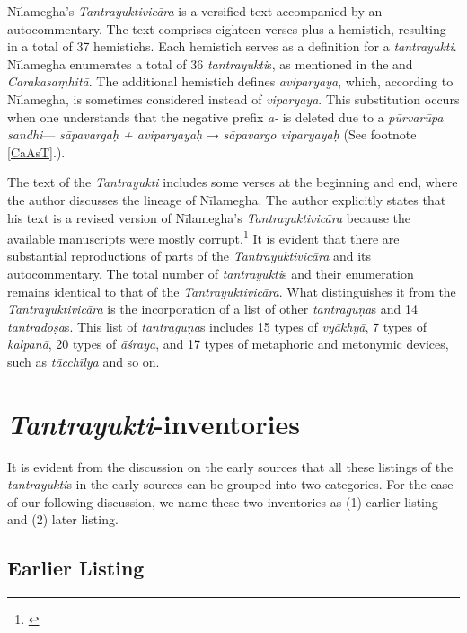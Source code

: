 Nīlamegha's \emph{Tantrayuktivicāra} is a versified text accompanied by an autocommentary. The text comprises eighteen verses plus a hemistich, resulting in a total of 37 hemistichs. Each hemistich serves as a definition for a \emph{tantrayukti}. Nīlamegha enumerates a total of 36 \emph{tantrayukti}s, as mentioned in the \AS and \emph{Carakasaṃhitā}. The additional hemistich defines \emph{aviparyaya}, which, according to Nīlamegha, is sometimes considered instead of \emph{viparyaya}. This substitution occurs when one understands that the negative prefix \emph{a-} is deleted due to a \emph{pūrvarūpa sandhi}--- \emph{sāpavargaḥ + aviparyayaḥ} → \emph{sāpavargo viparyayaḥ} (See footnote \ref{CaAsT}.).

The text of the \emph{Tantrayukti} includes some verses at the beginning and end, where the author discusses the lineage of Nīlamegha. The author explicitly states that his text is a revised version of Nīlamegha's \emph{Tantrayuktivicāra} because the available manuscripts were mostly corrupt.\footnote{
	\cite[1]{nara-1949}} 
It is evident that there are substantial reproductions of parts of the \emph{Tantrayuktivicāra} and its autocommentary. The total number of \emph{tantrayukti}s and their enumeration remains identical to that of the \emph{Tantrayuktivicāra}. What distinguishes it from the \emph{Tantrayuktivicāra} is the incorporation of a list of other \emph{tantraguṇa}s and 14 \emph{tantradoṣa}s. This list of \emph{tantraguṇa}s includes 15 types of \emph{vyākhyā}, 7 types of \emph{kalpanā}, 20 types of \emph{āśraya}, and 17 types of metaphoric and metonymic devices, such as \emph{tācchīlya} and so on.

\section{\emph{Tantrayukti}-inventories}

It is evident from the discussion on the early sources that all these listings of the \emph{tantrayukti}s in the early sources can be grouped into two categories. For the ease of our following discussion, we name these two inventories as (1) earlier listing and (2) later listing.

\subsection{Earlier Listing}

